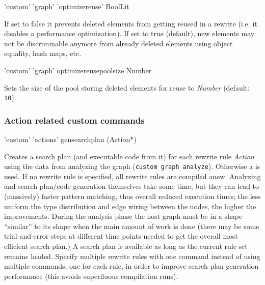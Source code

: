\begin{rail}
  'custom' 'graph' 'optimizereuse' BoolLit
\end{rail}
If set to false it prevents deleted elements from getting reused in a rewrite (i.e. it disables a performance optimization).
If set to true (default), new elements may not be discriminable anymore from already deleted elements using object equality, hash maps, etc.

\begin{rail}
  'custom' 'graph' optimizereusepoolsize Number
\end{rail}
Sets the size of the pool storing deleted elements for reuse to \emph{Number} (default: \texttt{10}).

\subsubsection*{Action related custom commands}

\begin{rail}
  'custom' 'actions' gensearchplan (Action*)
\end{rail}
Creates a search plan (and executable code from it) for each rewrite rule \emph{Action} using the data from analyzing the graph (\texttt{custom graph analyze}).
Otherwise a  is used.
If no rewrite rule is specified, all rewrite rules are compiled anew.
Analyzing and search plan/code generation themselves take some time, but they can lead to (massively) faster pattern matching, thus overall reduced execution times;
the less uniform the type distribution and edge wiring between the nodes, the higher the improvements.
During the analysis phase the host graph must be in a shape ``similar'' to its shape when the main amount of work is done
(there may be some trial-and-error steps at different time points needed to get the overall most efficient search plan.)
A search plan is available as long as the current rule set remains loaded.
Specify multiple rewrite rules with one command instead of using multiple commands, one for each rule, in order to improve search plan generation performance (this avoids superfluous compilation runs).


